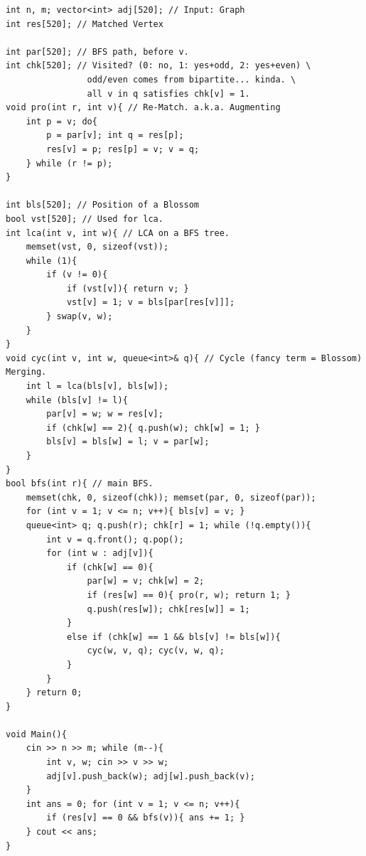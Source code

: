 \begin{verbatim}
int n, m; vector<int> adj[520]; // Input: Graph
int res[520]; // Matched Vertex

int par[520]; // BFS path, before v.
int chk[520]; // Visited? (0: no, 1: yes+odd, 2: yes+even) \
				odd/even comes from bipartite... kinda. \
				all v in q satisfies chk[v] = 1.
void pro(int r, int v){ // Re-Match. a.k.a. Augmenting
	int p = v; do{
		p = par[v]; int q = res[p];
		res[v] = p; res[p] = v; v = q;
	} while (r != p);
}

int bls[520]; // Position of a Blossom
bool vst[520]; // Used for lca.
int lca(int v, int w){ // LCA on a BFS tree.
	memset(vst, 0, sizeof(vst));
	while (1){
		if (v != 0){
			if (vst[v]){ return v; }
			vst[v] = 1; v = bls[par[res[v]]];
		} swap(v, w);
	}
}
void cyc(int v, int w, queue<int>& q){ // Cycle (fancy term = Blossom) Merging.
	int l = lca(bls[v], bls[w]);
	while (bls[v] != l){
		par[v] = w; w = res[v];
		if (chk[w] == 2){ q.push(w); chk[w] = 1; }
		bls[v] = bls[w] = l; v = par[w];
	}
}
bool bfs(int r){ // main BFS.
	memset(chk, 0, sizeof(chk)); memset(par, 0, sizeof(par));
	for (int v = 1; v <= n; v++){ bls[v] = v; }
	queue<int> q; q.push(r); chk[r] = 1; while (!q.empty()){
		int v = q.front(); q.pop();
		for (int w : adj[v]){
			if (chk[w] == 0){
				par[w] = v; chk[w] = 2;
				if (res[w] == 0){ pro(r, w); return 1; }
				q.push(res[w]); chk[res[w]] = 1;
			}
			else if (chk[w] == 1 && bls[v] != bls[w]){
				cyc(w, v, q); cyc(v, w, q);
			}
		}
	} return 0;
}

void Main(){
	cin >> n >> m; while (m--){
		int v, w; cin >> v >> w;
		adj[v].push_back(w); adj[w].push_back(v);
	}
	int ans = 0; for (int v = 1; v <= n; v++){
		if (res[v] == 0 && bfs(v)){ ans += 1; }
	} cout << ans;
}
\end{verbatim}